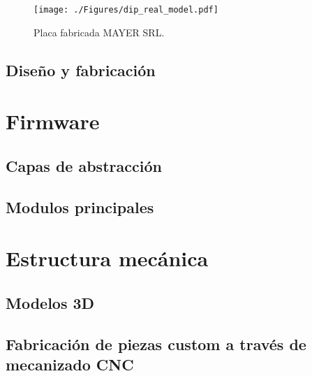 \begin{figure}[htbp]
	\centering
	\texttt{[image: ./Figures/dip\_real\_model.pdf]}
	\caption{Placa fabricada MAYER SRL.}
	\label{fig:dip_real_model}
\end{figure}

  
\subsection{Diseño y fabricación}



\section{Firmware}

\subsection{Capas de abstracción}
\subsection{Modulos principales}



\section{Estructura mecánica}

\subsection{Modelos 3D}
\subsection{Fabricación de piezas custom a través de mecanizado CNC}


